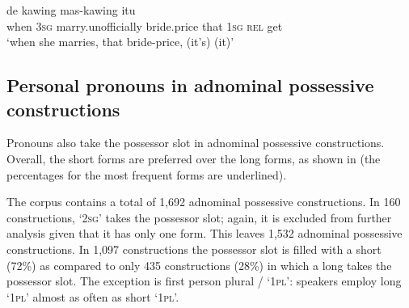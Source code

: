 \ea
\label{Example_6.24}
 {de} {kawing} {mas-kawing} {itu} {} {} {}\\ %
 when  \textsc{3sg}  marry.unofficially  bride.price  that  \textsc{1sg}  \textsc{rel}  get\\
\glt
‘when she marries, that bride-price, (it’s)  (it)’ \textstyleExampleSource{[081006-025-CvEx.0024]}
\z


\subsection{Personal pronouns in adnominal possessive constructions}
\label{Para_6.1.3}
Pronouns also take the possessor slot in adnominal possessive constructions. Overall, the short forms are preferred over the long forms, as shown in  (the percentages for the most frequent forms are underlined).



The corpus contains a total of 1,692 adnominal possessive constructions. In 160 constructions,  ‘\textsc{2sg}’ takes the possessor slot; again, it is excluded from further analysis given that it has only one form. This leaves 1,532 adnominal possessive constructions. In 1,097 constructions the possessor slot is filled with a short  (72\%) as compared to only 435 constructions (28\%) in which a long  takes the possessor slot. The exception is first person plural / ‘\textsc{1pl}’: speakers employ long  ‘\textsc{1pl}’ almost as often as short  ‘\textsc{1pl}’.


